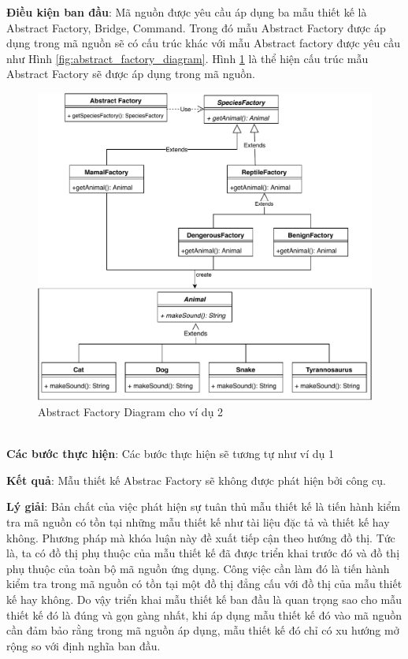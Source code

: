 \documentclass[12pt]{report}
\begin{document}
\noindent \textbf{Điều kiện ban đầu}: Mã nguồn được yêu cầu áp dụng ba mẫu thiết kế là Abstract Factory, Bridge, Command. Trong đó mẫu Abstract Factory được áp dụng trong mã nguồn sẽ có cấu trúc khác với mẫu Abstract factory được yêu cầu như Hình \ref{fig:abstract_factory_diagram}. Hình \ref{fig:abstract_factory_diaram_2} là thể hiện cấu trúc mẫu Abstract Factory sẽ được áp dụng trong mã nguồn.
\begin{figure}[h]
	\centering
	\includegraphics[scale=.7]{images/_abstract_factory_2.pdf}
	\caption{Abstract Factory Diagram cho ví dụ 2}
	\label{fig:abstract_factory_diaram_2}
\end{figure}\\
\noindent \textbf{Các bước thực hiện}: Các bước thực hiện sẽ tương tự như ví dụ 1 

\noindent \textbf{Kết quả}: Mẫu thiết kế Abstrac Factory sẽ không được phát hiện bởi công cụ.

\noindent \textbf{Lý giải}: Bản chất của việc phát hiện sự tuân thủ mẫu thiết kế là tiến hành kiểm tra mã nguồn có tồn tại những mẫu thiết kế như tài liệu đặc tả và thiết kế hay không. Phương pháp mà khóa luận này đề xuất tiếp cận theo hướng đồ thị. Tức là, ta có đồ thị phụ thuộc của mẫu thiết kế đã được triển khai trước đó và đồ thị phụ thuộc của toàn bộ mã nguồn ứng dụng. Công việc cần làm đó là tiến hành kiểm tra trong mã nguồn có tồn tại một đồ thị đẳng cấu với đồ thị của mẫu thiết kế hay không.
Do vậy triển khai mẫu thiết kế ban đầu là quan trọng sao cho mẫu thiết kế đó là đúng và gọn gàng nhất, khi áp dụng mẫu thiết kế đó vào mã nguồn cần đảm bảo rằng trong mã nguồn áp dụng, mẫu thiết kế đó chỉ có xu hướng mở rộng so với định nghĩa ban đầu.
\end{document}
